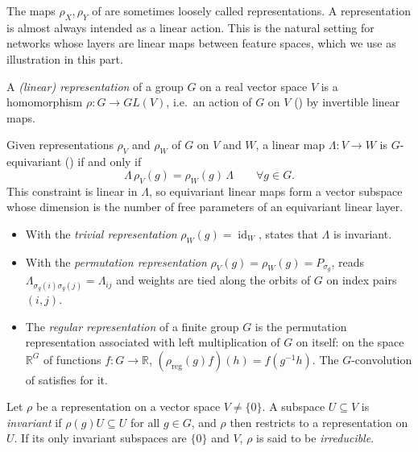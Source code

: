 \documentclass[mathematics,review,submit,moreauthors]{Definitions/mdpi}
\begin{document}
The maps $\rho_X,\rho_Y$ of  are sometimes loosely called representations.
A representation is almost always intended as a linear action.
This is the natural setting for networks whose layers are linear maps between feature spaces, which we use as illustration in this part.

\begin{Definition}\label{def:representation}
    A \emph{(linear) representation} of a group $G$ on a real vector space $V$ is a homomorphism $\rho:G\to GL(V)$, i.e.\ an action of $G$ on $V$ () by invertible linear maps.
\end{Definition}

Given representations $\rho_V$ and $\rho_W$ of $G$ on $V$ and $W$, a linear map $\Lambda:V\to W$ is $G$-equivariant () if and only if
\begin{equation}\label{eq:linear-equivariance}
    \Lambda\,\rho_V(g)=\rho_W(g)\,\Lambda\qquad\forall g\in G.
\end{equation}
This constraint is linear in $\Lambda$, so equivariant linear maps form a vector subspace whose dimension is the number of free parameters of an equivariant linear layer.

\begin{Example}\label{ex:representations-recap}
    \phantom{u}
    \begin{itemize}
        \item With the \emph{trivial representation} $\rho_W(g)=\operatorname{id}_W$,  states that $\Lambda$ is invariant.
        \item With the \emph{permutation representation} $\rho_V(g)=\rho_W(g)=P_{\sigma_g}$,  reads $\Lambda_{\sigma_g(i)\sigma_g(j)}=\Lambda_{ij}$ and weights are tied along the orbits of $G$ on index pairs $(i,j)$.
        \item The \emph{regular representation} of a finite group $G$ is the permutation representation associated with left multiplication of $G$ on itself: on the space $\mathbb{R}^G$ of functions $f:G\to\mathbb{R}$, $(\rho_{\mathrm{reg}}(g)f)(h)=f(g^{-1}h)$. The $G$-convolution of  satisfies  for it.
    \end{itemize}
\end{Example}

\begin{Definition}[Irreducibility]\label{def:irreducible}
    Let $\rho$ be a representation on a vector space $V\neq\{0\}$.
    A subspace $U\subseteq V$ is \emph{invariant} if $\rho(g)U\subseteq U$ for all $g\in G$, and $\rho$ then restricts to a representation on $U$.
    If its only invariant subspaces are $\{0\}$ and $V$, $\rho$ is said to be \emph{irreducible}.
\end{Definition}
\end{document}
